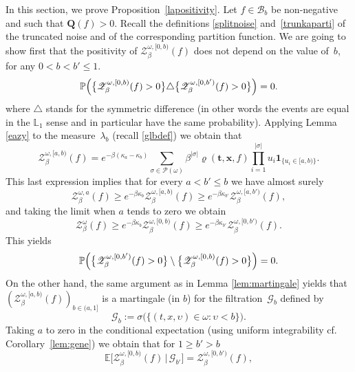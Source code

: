 \documentclass[11pt]{article}
\newcommand{\cf}{cf.\xspace}
\numberwithin{equation}{section}
\let\mathcal\mathscr
\let\sep:
\theoremstyle{definition}
\newcommand{\bt}{\boldsymbol{t}}
\newcommand{\bx}{\boldsymbol{x}}
\newcommand{\ind}{\mathbf{1}}
\newcommand{\cB}{{\ensuremath{\mathcal B}} }
\newcommand{\cP}{{\ensuremath{\mathcal P}} }
\newcommand{\cZ}{{\ensuremath{\mathcal Z}} }
\newcommand{\bQ}{{\ensuremath{\mathbf Q}} }
\newcommand{\bbE}{{\ensuremath{\mathbb E}} }
\newcommand{\bbL}{{\ensuremath{\mathbb L}} }
\newcommand{\bbP}{{\ensuremath{\mathbb P}} }
\let\gb\beta
\let\gl\lambda
\let\ups\upsilon
\let\go\omega
\begin{document}
In this section, we prove Proposition~\ref{lapositivity}.
Let $f\in \cB_b$ be non-negative and such that $\bQ(f)> 0$.
Recall the definitions \eqref{splitnoise} and~\eqref{trunkaparti} of the truncated noise and of the corresponding partition function. We are going to show first that the positivity of $\cZ^{\go,[0,b)}_\beta (f)$ does not depend on the value of~$b$,
for any $ 0<b< b'\le 1$.
\begin{equation}\label{ekwalzs}
\bbP\Bigl(\bigl\{ \cZ^{\go,[0,b)}_\beta (f)>0 \bigr\} \triangle \bigl\{ \cZ^{\go,[0,b')}_\beta (f) >0 \bigr\} \Bigr) =0.
\end{equation}
where $\triangle$ stands for the symmetric difference (in other words the events are equal in the $\bbL_1$ sense and in particular have the same probability).
Applying Lemma \ref{eazy} to the measure~$\gl_b$ (recall \eqref{glbdef}) we obtain that
\begin{equation}
\cZ^{\go,[a,b)}_\beta(f)= e^{-\gb (\kappa_a-\kappa_b)} \sum_{\sigma\in \cP(\go)} \beta^{|\sigma|} \varrho(\bt,\bx, f) \prod_{i=1}^{|\sigma|} u_i\ind_{\{ u_i\in[a,b) \}}.
\end{equation}
This last expression implies that for every $a<b' \leq b$ we have almost surely
\begin{equation}
\label{eq:ZaZab}
\cZ^{\go,a}_\beta (f) \ge e^{-\gb\kappa_b}\cZ^{\go,[a,b)}_\beta (f) \ge e^{-\gb\kappa_{b'}} \cZ^{\go,[a,b')}_\beta (f),
\end{equation}
and taking the limit when $a$ tends to zero we obtain
\begin{equation}
\cZ^{\go}_\beta (f) \ge e^{-\gb\kappa_b} \cZ^{\go,[0,b)}_\beta (f) \ge e^{-\gb\kappa_{b'}} \cZ^{\go,[0,b')}_\beta (f).
\end{equation}
This yields
\[
\bbP\Bigl(\bigl\{ \cZ^{\go,[0,b')}_\beta (f)>0 \bigr\} \setminus \bigl\{ \cZ^{\go,[0,b)}_\beta (f) >0 \bigr\} \Bigr) =0.
\]
On the other hand, the same argument as in Lemma \ref{lem:martingale} yields that $
(\cZ^{\go,[a,b)}_\beta (f))_{b\in(a,1]}$ is a martingale (in $b$) for the filtration~$\mathcal{G}_b$ defined by
\begin{equation}
\mathcal G_b:= \sigma \bigl(\{ (t,x,\ups)\in \go \sep \ups <b \}\bigr).
\end{equation}
Taking $a$ to zero in the conditional expectation (using uniform integrability \cf Corol\-lary~\ref{lem:gene}) we obtain that for $1\geq b'>b$
\begin{equation}
\bbE \bigl[ \cZ^{\go,[0, b)}_\beta (f) \, \big| \, \mathcal G_{ b'} \bigr]= \cZ^{\go,[0, b')}_\beta (f),
\end{equation}
\end{document}
